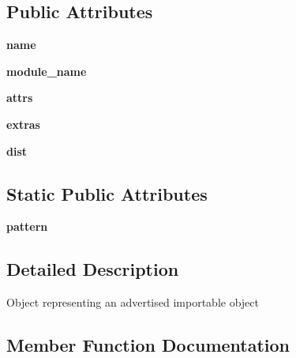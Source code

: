 \subsection*{Public Attributes}
\begin{DoxyCompactItemize}
\item 
\mbox{\label{classpkg__resources_1_1_entry_point_a91cc24785899a45662cb316373d754d5}} 
{\bfseries name}
\item 
\mbox{\label{classpkg__resources_1_1_entry_point_a2b39408f1bde9801e87a597f3b461b3b}} 
{\bfseries module\+\_\+name}
\item 
\mbox{\label{classpkg__resources_1_1_entry_point_aa9c9f7e56c09f62289e21c2fd012c11d}} 
{\bfseries attrs}
\item 
\mbox{\label{classpkg__resources_1_1_entry_point_a71c2a88d7240ad67d94466f4de66597d}} 
{\bfseries extras}
\item 
\mbox{\label{classpkg__resources_1_1_entry_point_aaae30521771283be73c089513c377773}} 
{\bfseries dist}
\end{DoxyCompactItemize}
\subsection*{Static Public Attributes}
\begin{DoxyCompactItemize}
\item 
{\bfseries pattern}
\end{DoxyCompactItemize}


\subsection{Detailed Description}
\begin{DoxyVerb}Object representing an advertised importable object\end{DoxyVerb}
 

\subsection{Member Function Documentation}
\mbox{\label{classpkg__resources_1_1_entry_point_a5438200cf3226e4762a3b94a456be23a}} 
